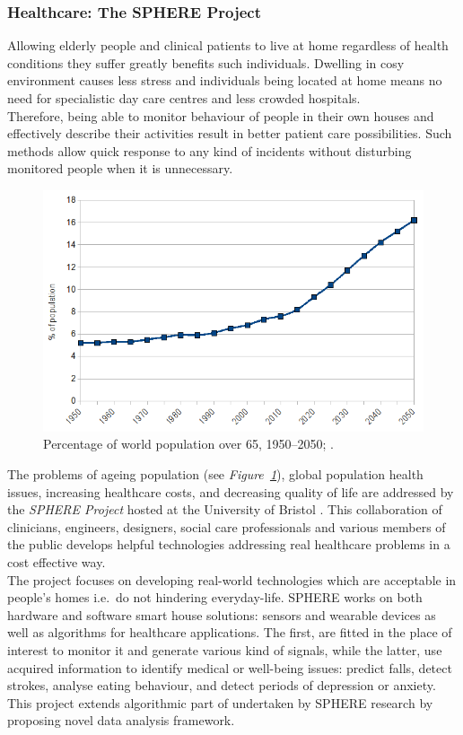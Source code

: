 \documentclass[12pt, a4paper, pdflatex, leqno, twoside, openright]{report}
\begin{document}
      \subsubsection{Healthcare: The SPHERE Project}
Allowing elderly people and clinical patients to live at home regardless of health conditions they suffer greatly benefits such individuals. Dwelling in cosy environment causes less stress and individuals being located at home means no need for specialistic day care centres and less crowded hospitals.\\
Therefore, being able to monitor behaviour of people in their own houses and effectively describe their activities result in better patient care possibilities. Such methods allow quick response to any kind of incidents without disturbing monitored people when it is unnecessary.

\begin{figure}
  \centering
  \includegraphics[scale=.5]{./gfx/populationOver65}
  \caption{Percentage of world population over 65, 1950--2050; \citep{populationAgeing}.\label{fig:agingPopulatiom}}
\end{figure}

The problems of ageing population (see \emph{Figure~\ref{fig:agingPopulatiom}}), global population health issues, increasing healthcare costs, and decreasing quality of life are addressed by the \emph{SPHERE Project} hosted at the University of Bristol \citep{sphere}. This collaboration of clinicians, engineers, designers, social care professionals and various members of the public develops helpful technologies addressing real healthcare problems in a cost effective way.\\
The project focuses on developing real-world technologies which are acceptable in people's homes i.e.\ do not hindering everyday-life. SPHERE works on both hardware and software smart house solutions: sensors and wearable devices as well as algorithms for healthcare applications. The first, are fitted in the place of interest to monitor it and generate various kind of signals, while the latter, use acquired information to identify medical or well-being issues: predict falls, detect strokes, analyse eating behaviour, and detect periods of depression or anxiety.\\
This project extends algorithmic part of undertaken by SPHERE research by proposing novel data analysis framework.
\end{document}
